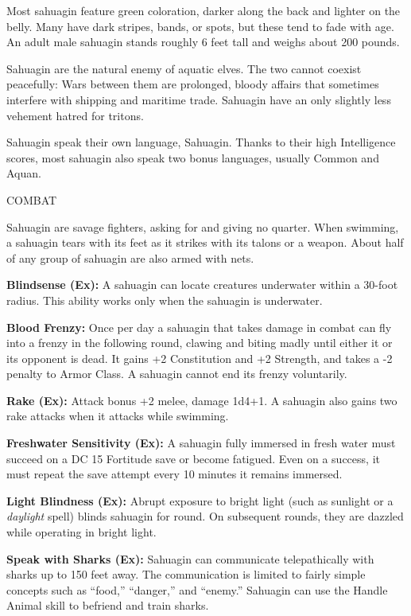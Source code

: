 \documentclass{article}
\begin{document}
Most sahuagin feature green coloration, darker along the back and lighter on the 
belly. Many have dark stripes, bands, or spots, but these tend to fade with age. 
An adult male sahuagin stands roughly 6 feet tall and weighs about 200 pounds. 

Sahuagin are the natural enemy of aquatic elves. The two cannot coexist peacefully: 
Wars between them are prolonged, bloody affairs that sometimes interfere with shipping 
and maritime trade. Sahuagin have an only slightly less vehement hatred for tritons.

Sahuagin speak their own language, Sahuagin. Thanks to their high Intelligence 
scores, most sahuagin also speak two bonus languages, usually Common and Aquan.

COMBAT

Sahuagin are savage fighters, asking for and giving no quarter. When swimming, 
a sahuagin tears with its feet as it strikes with its talons or a weapon. About 
half of any group of sahuagin are also armed with nets.

\textbf{Blindsense (Ex): }A sahuagin can locate creatures underwater within a 30-foot 
radius. This ability works only when the sahuagin is underwater.

\textbf{Blood Frenzy: }Once per day a sahuagin that takes damage in combat can 
fly into a frenzy in the following round, clawing and biting madly until either 
it or its opponent is dead. It gains +2 Constitution and +2 Strength, and takes 
a -2 penalty to Armor Class. A sahuagin cannot end its frenzy voluntarily. 

\textbf{Rake (Ex): }Attack bonus +2 melee, damage 1d4+1. A sahuagin also gains 
two rake attacks when it attacks while swimming.

\textbf{Freshwater Sensitivity (Ex): }A sahuagin fully immersed in fresh water 
must succeed on a DC 15 Fortitude save or become fatigued. Even on a success, it 
must repeat the save attempt every 10 minutes it remains immersed.

\textbf{Light Blindness (Ex): }Abrupt exposure to bright light (such as sunlight 
or a \textit{daylight }spell) blinds sahuagin for round. On subsequent rounds, 
they are dazzled while operating in bright light.

\textbf{Speak with Sharks (Ex): }Sahuagin can communicate telepathically with sharks 
up to 150 feet away. The communication is limited to fairly simple concepts such 
as ``food,'' ``danger,'' and ``enemy.'' Sahuagin can use the Handle Animal skill 
to befriend and train sharks.
\end{document}
